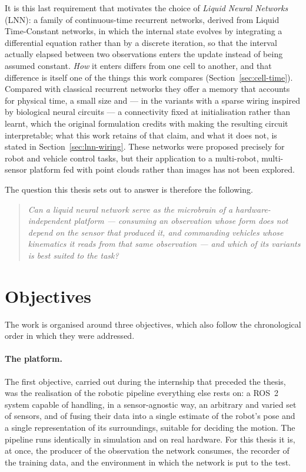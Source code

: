 It is this last requirement that motivates the choice of \emph{Liquid Neural
Networks} (LNN): a family of continuous-time recurrent networks, derived from
Liquid Time-Constant networks, in which the internal state evolves by
integrating a differential equation rather than by a discrete iteration, so
that the interval actually elapsed between two observations enters the update
instead of being assumed constant. \emph{How} it enters differs from one cell
to another, and that difference is itself one of the things this work compares
(Section~\ref{sec:cell-time}). Compared with classical recurrent networks they
offer a memory that accounts for physical time, a small size and --- in the
variants with a sparse wiring inspired by biological neural circuits --- a
connectivity fixed at initialisation rather than learnt, which the original
formulation credits with making the resulting circuit interpretable; what this
work retains of that claim, and what it does not, is stated in
Section~\ref{sec:lnn-wiring}. These networks were proposed precisely for robot
and vehicle control tasks, but their application to a multi-robot, multi-sensor
platform fed with point clouds rather than images has not been explored.

The question this thesis sets out to answer is therefore the following.

\begin{quote}
\emph{Can a liquid neural network serve as the microbrain of a
hardware-independent platform --- consuming an observation whose form does not
depend on the sensor that produced it, and commanding vehicles whose kinematics
it reads from that same observation --- and which of its variants is best suited
to the task?}
\end{quote}

\section{Objectives}

The work is organised around three objectives, which also follow the
chronological order in which they were addressed.

\paragraph{The platform.}
The first objective, carried out during the internship that preceded the
thesis, was the realisation of the robotic pipeline everything else rests on: a
ROS~2 system capable of handling, in a sensor-agnostic way, an arbitrary and
varied set of sensors, and of fusing their data into a single estimate of the
robot's pose and a single representation of its surroundings, suitable for
deciding the motion. The pipeline runs identically in simulation and on real
hardware. For this thesis it is, at once, the producer of the observation the
network consumes, the recorder of the training data, and the environment in
which the network is put to the test.

